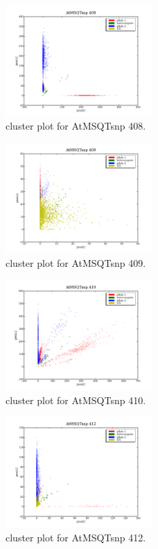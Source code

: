 \begin{figure}[H]
\includegraphics[width=0.5\textwidth]{figures/cluster_plot_AtMSQTsnp_408.png}
\caption{cluster plot for AtMSQTsnp 408.} \label{flAtMSQTsnp408}
\end{figure}

\begin{figure}[H]
\includegraphics[width=0.5\textwidth]{figures/cluster_plot_AtMSQTsnp_409.png}
\caption{cluster plot for AtMSQTsnp 409.} \label{flAtMSQTsnp409}
\end{figure}

\begin{figure}[H]
\includegraphics[width=0.5\textwidth]{figures/cluster_plot_AtMSQTsnp_410.png}
\caption{cluster plot for AtMSQTsnp 410.} \label{flAtMSQTsnp410}
\end{figure}

\begin{figure}[H]
\includegraphics[width=0.5\textwidth]{figures/cluster_plot_AtMSQTsnp_412.png}
\caption{cluster plot for AtMSQTsnp 412.} \label{flAtMSQTsnp412}
\end{figure}

